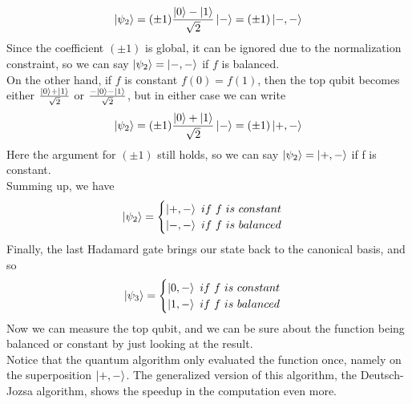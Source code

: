\documentclass[12pt,a4paper]{report}
\theoremstyle{definition}
\theoremstyle{definition}
\theoremstyle{definition}
\begin{document}
\begin{equation*}
    \ket{\psi_2}=(\pm 1)\frac{\ket{0}-\ket{1}}{\sqrt{2}}\ket{-}=(\pm 1)\ket{-,-}
\end{equation*}
Since the coefficient $(\pm 1)$ is global, it can be ignored due to the normalization constraint, so we can say $\ket{\psi_2}=\ket{-,-}$ if $f$ is balanced.\\
On the other hand, if $f$ is constant $f(0)=f(1)$, then the top qubit becomes either $\frac{\ket{0}+\ket{1}}{\sqrt{2}}$ or $\frac{-\ket{0}-\ket{1}}{\sqrt{2}}$, but in either case we can write
\begin{equation*}
    \ket{\psi_2}=(\pm 1)\frac{\ket{0}+\ket{1}}{\sqrt{2}}\ket{-}=(\pm 1)\ket{+,-}
\end{equation*}
Here the argument for $(\pm 1)$ still holds, so we can say $\ket{\psi_2}=\ket{+,-}$ if f is constant.\\
Summing up, we have
\begin{equation*}
    \ket{\psi_2}=\begin{cases}
        \ket{+,-}\ if\ f\ is\ constant\\
        \ket{-,-}\ if\ f\ is\ balanced
    \end{cases}
\end{equation*}
Finally, the last Hadamard gate brings our state back to the canonical basis, and so
\begin{equation*}
    \ket{\psi_3} = \begin{cases}
        \ket{0,-}\ if\ f\ is\ constant\\
        \ket{1,-}\ if\ f\ is\ balanced
    \end{cases}
\end{equation*}
Now we can measure the top qubit, and we can be sure about the function being balanced or constant by just looking at the result.\\
Notice that the quantum algorithm only evaluated the function once, namely on the superposition $\ket{+,-}$. The generalized version of this algorithm, the Deutsch-Jozsa algorithm, shows the speedup in the computation even more.
\end{document}
